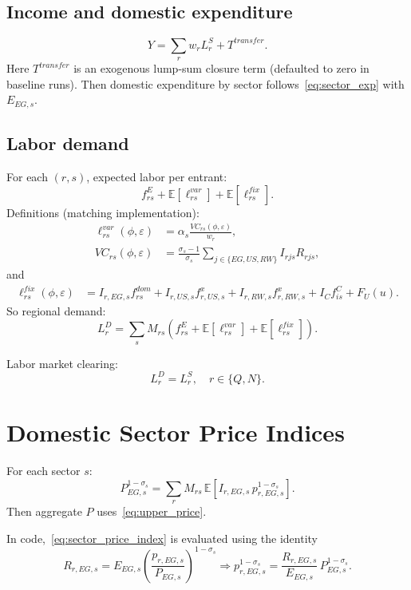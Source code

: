 \documentclass[11pt]{article}
\begin{document}
\subsection{Income and domestic expenditure}
\begin{equation}
Y = \sum_r w_r L^S_r + T^{transfer}.
\label{eq:income}
\end{equation}
Here $T^{transfer}$ is an exogenous lump-sum closure term (defaulted to zero in baseline runs).
Then domestic expenditure by sector follows~\eqref{eq:sector_exp} with $E_{EG,s}$.

\subsection{Labor demand}
For each $(r,s)$, expected labor per entrant:
\[
f^E_{rs} + \mathbb E[\ell^{var}_{rs}] + \mathbb E[\ell^{fix}_{rs}].
\]
Definitions (matching implementation):
\begin{align}
\ell^{var}_{rs}(\phi,\varepsilon)
&=
\alpha_s\frac{VC_{rs}(\phi,\varepsilon)}{w_r},
\\
VC_{rs}(\phi,\varepsilon)
&=
\frac{\sigma_s-1}{\sigma_s}
\sum_{j\in\{EG,US,RW\}} I_{rjs} R_{rjs},
\end{align}
and
\begin{align}
\ell^{fix}_{rs}(\phi,\varepsilon)
&=
I_{r,EG,s} f^{dom}_{rs}
+I_{r,US,s} f^x_{r,US,s}
+I_{r,RW,s} f^x_{r,RW,s}
+I_C f^C_{is}
+F_U(u).
\end{align}
So regional demand:
\begin{equation}
L^D_r
=
\sum_s M_{rs}
\left(
f^E_{rs}
+\mathbb E[\ell^{var}_{rs}]
+\mathbb E[\ell^{fix}_{rs}]
\right).
\label{eq:labor_demand}
\end{equation}

Labor market clearing:
\begin{equation}
L^D_r=L^S_r,\quad r\in\{Q,N\}.
\label{eq:labor_clear}
\end{equation}

\section{Domestic Sector Price Indices}
For each sector $s$:
\begin{equation}
P_{EG,s}^{1-\sigma_s}
=
\sum_r M_{rs}\,
\mathbb E\!\left[
I_{r,EG,s}\, p_{r,EG,s}^{1-\sigma_s}
\right].
\label{eq:sector_price_index}
\end{equation}
Then aggregate $P$ uses~\eqref{eq:upper_price}.

In code,~\eqref{eq:sector_price_index} is evaluated using the identity
\[
R_{r,EG,s}=E_{EG,s}\left(\frac{p_{r,EG,s}}{P_{EG,s}}\right)^{1-\sigma_s}
\Rightarrow
p_{r,EG,s}^{1-\sigma_s}
=
\frac{R_{r,EG,s}}{E_{EG,s}}\,P_{EG,s}^{1-\sigma_s}.
\]
\end{document}
